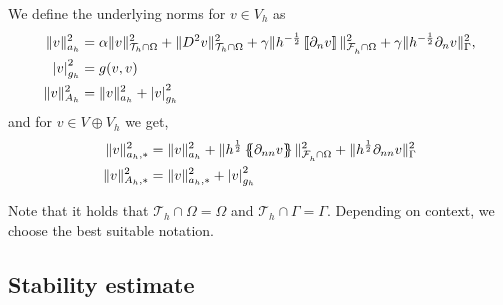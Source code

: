 We define the underlying norms for $ v \in V_{h} $ as
    \begin{align}
        \label{eq:bi_ah_norm}
        \| v \|_{ a_{h} }^{ 2 } & =    \alpha \|   v \|_{ \mathcal{T} _{h} \cap \Omega  }^{ 2}  + \| D^2 v \|_{\mathcal{T} _{h} \cap \Omega   }^{ 2 } + \gamma \| h^{-\frac{1}{2}} \left[\!\left[  \partial _{n} v  \right]\!\right]   \|_{ \mathcal{F}_{h}^{}\cap \Omega    }^{ 2
        } + \gamma \| h^{-\frac{1}{2}}  \partial _{n} v    \|_{ \Gamma   }^{ 2 },    \\
        \label{eq:bi_gh_norm}
\left\lvert  v  \right\rvert _{g_{h}}^{2} & = g( v,v) \\
        \label{eq:bi_Ah_norm}
\| v \|_{A_{h}  }^{  2}  & = \| v \|_{ a_{h} }^{ 2 } + \left\lvert  v  \right\rvert _{g_{h}}^{2} \\
    \end{align}
and for $v \in V \oplus V_{h}$ we get, \[
    \begin{split}
\| v \|_{ a_{h}, * }^{  2} & =\| v \|_{ a_{h} }^{ 2 } +  \| h^{\frac{1}{2}} \left\{\!\!\left\{ \partial _{nn} v \right\}\!\!\right\}   \|_{\mathcal{F} _{h}^{} \cap \Omega   }^{  2} +  \| h^{\frac{1}{2}} \partial _{nn} v    \|_{ \Gamma }^{  2}  \\
\| v \|_{A_{h},*  }^{  2}  & = \| v \|_{ a_{h},* }^{ 2 } + \left\lvert  v  \right\rvert _{g_{h}}^{2}
    \end{split}
\]
\begin{remark}
Note that it holds that $\mathcal{T} _{h} \cap  \Omega   = \Omega  $ and $\mathcal{T} _{h} \cap  \Gamma  = \Gamma $. Depending on context, we choose the best suitable notation.
\end{remark}



\subsection{Stability estimate}%
\label{sub:stability_estimate}

